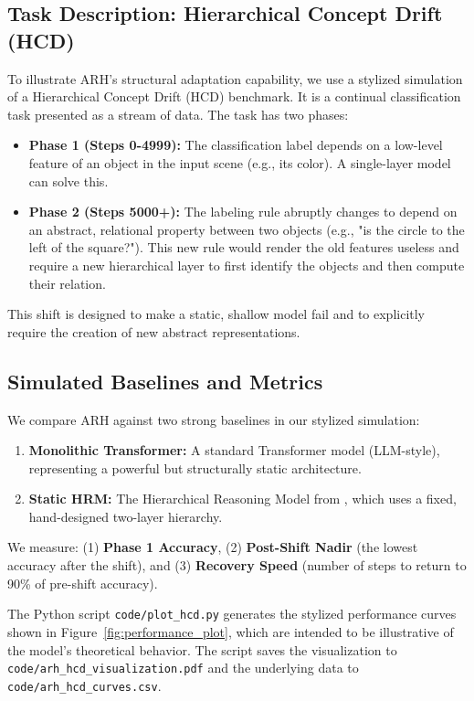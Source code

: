 \documentclass{article}
\begin{document}
\subsection{Task Description: Hierarchical Concept Drift (HCD)}
To illustrate ARH's structural adaptation capability, we use a stylized simulation of a Hierarchical Concept Drift (HCD) benchmark. It is a continual classification task presented as a stream of data. The task has two phases:
\begin{itemize}
    \item \textbf{Phase 1 (Steps 0-4999):} The classification label depends on a low-level feature of an object in the input scene (e.g., its color). A single-layer model can solve this.
    \item \textbf{Phase 2 (Steps 5000+):} The labeling rule abruptly changes to depend on an abstract, relational property between two objects (e.g., "is the circle to the left of the square?"). This new rule would render the old features useless and require a new hierarchical layer to first identify the objects and then compute their relation.
\end{itemize}
This shift is designed to make a static, shallow model fail and to explicitly require the creation of new abstract representations.

\subsection{Simulated Baselines and Metrics}
We compare ARH against two strong baselines in our stylized simulation:
\begin{enumerate}
    \item \textbf{Monolithic Transformer:} A standard Transformer model (LLM-style), representing a powerful but structurally static architecture.
    \item \textbf{Static HRM:} The Hierarchical Reasoning Model from \citet{HRM2025}, which uses a fixed, hand-designed two-layer hierarchy.
\end{enumerate}
We measure: (1) \textbf{Phase 1 Accuracy}, (2) \textbf{Post-Shift Nadir} (the lowest accuracy after the shift), and (3) \textbf{Recovery Speed} (number of steps to return to 90\% of pre-shift accuracy).

The Python script \texttt{code/plot\_hcd.py} generates the stylized performance curves shown in Figure~\ref{fig:performance_plot}, which are intended to be illustrative of the model's theoretical behavior. The script saves the visualization to \texttt{code/arh\_hcd\_visualization.pdf} and the underlying data to \texttt{code/arh\_hcd\_curves.csv}.
\end{document}
